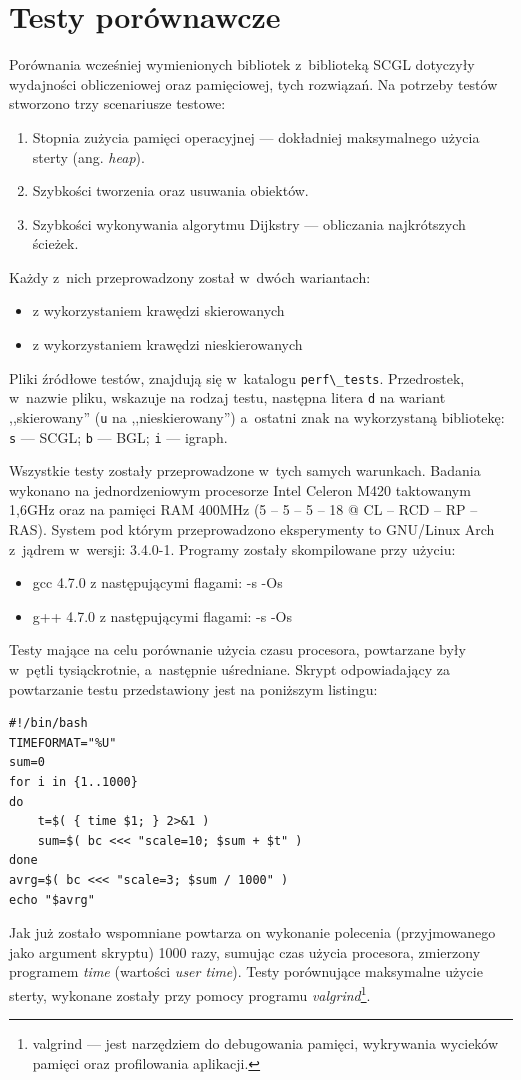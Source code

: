 \documentclass[a4paper,12pt,polish,oneside,openright]{thesis}
\newcommand\code[1]{\lstinline[style=line]{#1}}
\begin{document}
\section{Testy porównawcze}
Porównania wcześniej wymienionych bibliotek z~biblioteką SCGL dotyczyły wydajności obliczeniowej oraz pamięciowej, tych rozwiązań.
Na potrzeby testów stworzono trzy scenariusze testowe:
\begin{enumerate}
	\item Stopnia zużycia pamięci operacyjnej --- dokładniej maksymalnego użycia sterty (ang. \emph{heap}).
	\item Szybkości tworzenia oraz usuwania obiektów.
	\item Szybkości wykonywania algorytmu Dijkstry --- obliczania najkrótszych ścieżek.
\end{enumerate}
Każdy z~nich przeprowadzony został w~dwóch wariantach:
\begin{itemize}
	\item z wykorzystaniem krawędzi skierowanych
	\item z wykorzystaniem krawędzi nieskierowanych
\end{itemize}
Pliki źródłowe testów, znajdują się w~katalogu \code{perf\_tests}.
Przedrostek, w~nazwie pliku, wskazuje na rodzaj testu, następna litera \code{d} na wariant ,,skierowany'' (\code{u} na ,,nieskierowany'') a~ostatni znak na wykorzystaną bibliotekę: \code{s} --- SCGL; \code{b} --- BGL; \code{i} --- igraph.

Wszystkie testy zostały przeprowadzone w~tych samych warunkach.
Badania wykonano na jednordzeniowym procesorze Intel Celeron M420 taktowanym 1,6GHz oraz na pamięci RAM 400MHz (5 -- 5 -- 5 -- 18 @ CL -- RCD -- RP -- RAS).
System pod którym przeprowadzono eksperymenty to GNU/Linux Arch z~jądrem w~wersji: 3.4.0-1.
Programy zostały skompilowane przy użyciu:
\begin{itemize}
	\item gcc 4.7.0 z następującymi flagami: -s -Os
	\item g++ 4.7.0 z następującymi flagami: -s -Os
\end{itemize}

Testy mające na celu porównanie użycia czasu procesora, powtarzane były w~pętli tysiąckrotnie, a~następnie uśredniane.
Skrypt odpowiadający za powtarzanie testu przedstawiony jest na poniższym listingu:
\begin{lstlisting}[style=code]
#!/bin/bash
TIMEFORMAT="%U"
sum=0
for i in {1..1000}
do
	t=$( { time $1; } 2>&1 )
	sum=$( bc <<< "scale=10; $sum + $t" )
done
avrg=$( bc <<< "scale=3; $sum / 1000" )
echo "$avrg"
\end{lstlisting}
Jak już zostało wspomniane powtarza on wykonanie polecenia (przyjmowanego jako argument skryptu) 1000 razy, sumując czas użycia procesora, zmierzony programem \emph{time} (wartości \emph{user time}).
Testy porównujące maksymalne użycie sterty, wykonane zostały przy pomocy programu \emph{valgrind}\footnote{valgrind --- jest narzędziem do debugowania pamięci, wykrywania wycieków pamięci oraz profilowania aplikacji.}.
\end{document}
